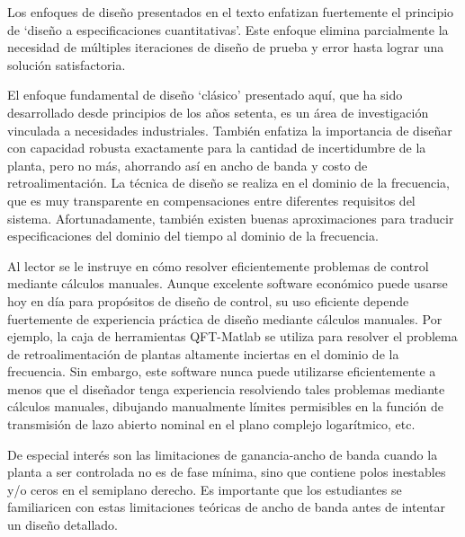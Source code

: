\documentclass[
	spanish, %
	letterpaper, oneside
]{book}
\begin{document}
\begin{abstractd}
	Los enfoques de diseño presentados en el texto enfatizan fuertemente el principio de `diseño a especificaciones cuantitativas'. Este enfoque elimina parcialmente la necesidad de múltiples iteraciones de diseño de prueba y error hasta lograr una solución satisfactoria.

	El enfoque fundamental de diseño `clásico' presentado aquí, que ha sido desarrollado desde principios de los años setenta, es un área de investigación vinculada a necesidades industriales. También enfatiza la importancia de diseñar con capacidad robusta exactamente para la cantidad de incertidumbre de la planta, pero no más, ahorrando así en ancho de banda y costo de retroalimentación. La técnica de diseño se realiza en el dominio de la frecuencia, que es muy transparente en compensaciones entre diferentes requisitos del sistema. Afortunadamente, también existen buenas aproximaciones para traducir especificaciones del dominio del tiempo al dominio de la frecuencia.

	Al lector se le instruye en cómo resolver eficientemente problemas de control mediante cálculos manuales. Aunque excelente software económico puede usarse hoy en día para propósitos de diseño de control, su uso eficiente depende fuertemente de experiencia práctica de diseño mediante cálculos manuales. Por ejemplo, la caja de herramientas QFT-Matlab se utiliza para resolver el problema de retroalimentación de plantas altamente inciertas en el dominio de la frecuencia. Sin embargo, este software nunca puede utilizarse eficientemente a menos que el diseñador tenga experiencia resolviendo tales problemas mediante cálculos manuales, dibujando manualmente límites permisibles en la función de transmisión de lazo abierto nominal en el plano complejo logarítmico, etc.

	De especial interés son las limitaciones de ganancia-ancho de banda cuando la planta a ser controlada no es de fase mínima, sino que contiene polos inestables y/o ceros en el semiplano derecho. Es importante que los estudiantes se familiaricen con estas limitaciones teóricas de ancho de banda antes de intentar un diseño detallado.


\end{abstractd}
\end{document}
